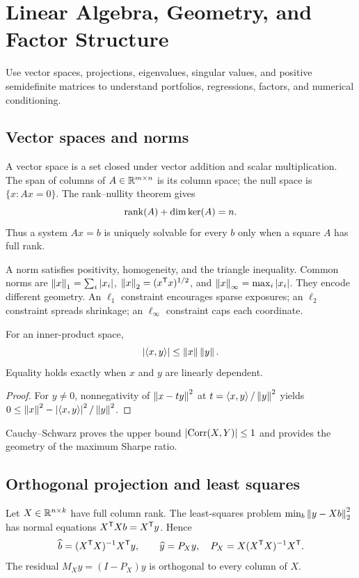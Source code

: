 \chapter{Linear Algebra, Geometry, and Factor Structure}

\begin{objectives}
Use vector spaces, projections, eigenvalues, singular values, and positive
semidefinite matrices to understand portfolios, regressions, factors, and numerical
conditioning.
\end{objectives}

\section{Vector spaces and norms}

A vector space is a set closed under vector addition and scalar multiplication.
The span of columns of $A\in\mathbb R^{m\times n}$ is its column space; the null space is
$\{x:Ax=0\}$. The rank--nullity theorem gives
\[
\operatorname{rank}(A)+\dim\ker(A)=n.
\]
Thus a system $Ax=b$ is uniquely solvable for every $b$ only when a square $A$ has
full rank.

A norm satisfies positivity, homogeneity, and the triangle inequality. Common norms
are $\left\lVert x\right\rVert_1=\sum_i\left|x_i\right|$, $\left\lVert x\right\rVert_2=(x^\mathsf T x)^{1/2}$, and
$\left\lVert x\right\rVert_\infty=\max_i\left|x_i\right|$. They encode different geometry. An $\ell_1$
constraint encourages sparse exposures; an $\ell_2$ constraint spreads shrinkage;
an $\ell_\infty$ constraint caps each coordinate.

\begin{theorem}
For an inner-product space,
\[
\left|\left\langle x,y\right\rangle\right|\leq\left\lVert x\right\rVert\left\lVert y\right\rVert.
\]
Equality holds exactly when $x$ and $y$ are linearly dependent.
\end{theorem}
\begin{proof}
For $y\neq0$, nonnegativity of
$\left\lVert x-t y\right\rVert^2$ at $t=\left\langle x,y\right\rangle/\left\lVert y\right\rVert^2$ yields
$0\leq\left\lVert x\right\rVert^2-\left|\left\langle x,y\right\rangle\right|^2/\left\lVert y\right\rVert^2$.
\end{proof}

Cauchy--Schwarz proves the upper bound $\left|\operatorname{Corr}(X,Y)\right|\leq1$ and provides the
geometry of the maximum Sharpe ratio.

\section{Orthogonal projection and least squares}

Let $X\in\mathbb R^{n\times k}$ have full column rank. The least-squares problem
$\min_b\left\lVert y-Xb\right\rVert_2^2$ has normal equations $X^\mathsf T Xb=X^\mathsf T y$.
Hence
\[
\widehat b=(X^\mathsf T X)^{-1}X^\mathsf T y,\qquad
\widehat y=P_Xy,\quad
P_X=X(X^\mathsf T X)^{-1}X^\mathsf T.
\]
The residual $M_Xy=(I-P_X)y$ is orthogonal to every column of $X$.

